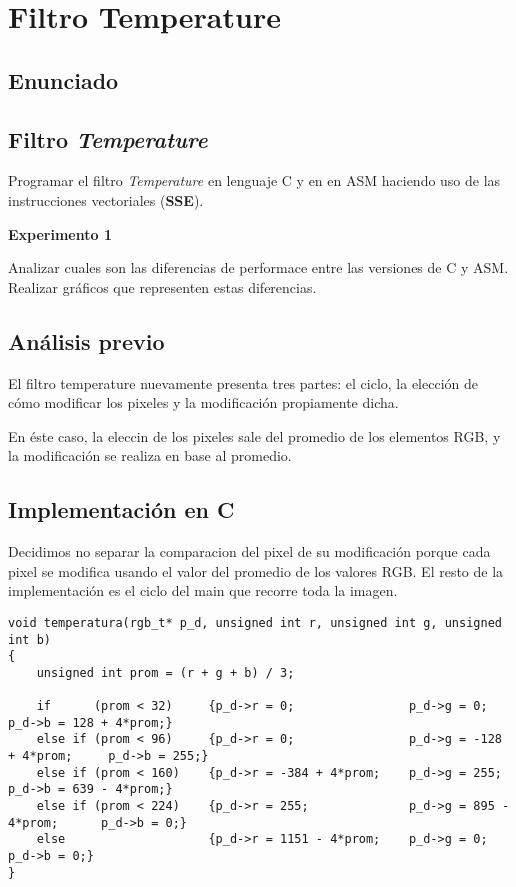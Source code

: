 \section{Filtro Temperature}
\subsection{Enunciado}

\subsection*{Filtro \textit{Temperature}}

  Programar el filtro \textit{Temperature} en lenguaje C y en en ASM haciendo uso de 
  las instrucciones vectoriales (\textbf{SSE}).


\vspace*{0.3cm} \noindent
\textbf{Experimento 1}

  Analizar cuales son las diferencias de performace entre las versiones de C y ASM. 
  Realizar gráficos que representen estas diferencias.
  
\subsection{An\'alisis previo}

El filtro temperature nuevamente presenta tres partes: el ciclo, la elecci\'on de c\'omo modificar los pixeles y la modificaci\'on propiamente dicha.

En \'este caso, la eleccin de los pixeles sale del promedio de los elementos RGB, y la modificaci\'on se realiza en base al promedio.

\subsection{Implementaci\'on en C}

Decidimos no separar la comparacion del pixel de su modificaci\'on porque cada pixel se modifica usando el valor del promedio de los valores RGB. El resto de la implementaci\'on es el ciclo del main que recorre toda la imagen.

\begin{codesnippet}
\begin{verbatim}
void temperatura(rgb_t* p_d, unsigned int r, unsigned int g, unsigned int b)
{
    unsigned int prom = (r + g + b) / 3;

    if 		(prom < 32)		{p_d->r = 0; 				p_d->g = 0; 				p_d->b = 128 + 4*prom;}
    else if (prom < 96)		{p_d->r = 0; 				p_d->g = -128 + 4*prom; 	p_d->b = 255;}
    else if (prom < 160)	{p_d->r = -384 + 4*prom;	p_d->g = 255; 				p_d->b = 639 - 4*prom;}
    else if (prom < 224)	{p_d->r = 255; 				p_d->g = 895 - 4*prom;	 	p_d->b = 0;}
    else 					{p_d->r = 1151 - 4*prom;	p_d->g = 0; 				p_d->b = 0;}
}
\end{verbatim}
\end{codesnippet}

